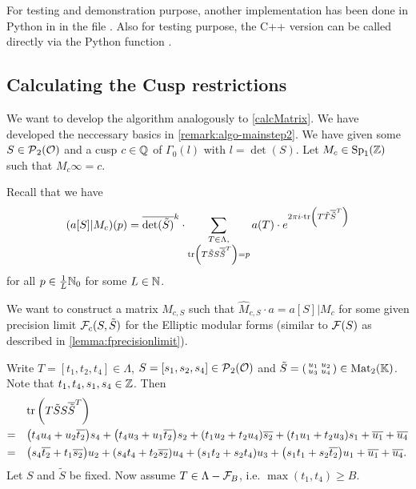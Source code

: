 For testing and demonstration purpose, another implementation has been done in Python in  in the file . Also for testing purpose, the C++ version can be called directly via the Python function .

\subsection{Calculating the Cusp restrictions}
\label{calcMatrixTrans}
We want to develop the algorithm analogously to \cref{calcMatrix}. We have developed the neccessary basics in \cref{remark:algo-mainstep2}. We have given some $S \in \operatorname{\mathcal{P}}_2(\mathcal{O})$ and a cusp $c \in \mathbb{Q}$ of $\Gamma_0(l)$ with $l = \det(S)$. Let $M_c \in \operatorname{Sp}_1(\mathbb{Z})$ such that $M_c \infty = c$.

Recall that we have
\[ (a[S]| M_c) (p) = \overline{\det(\tilde{S})}^k \cdot \sum_{\begin{subarray}{c}
T \in \Lambda,\\
\textup{\textrm{tr}}\left(T \tilde{S} S \overline{\tilde{S}}^T\right) = p
\end{subarray}} a(T) \cdot e^{2 \pi i \cdot \textup{\textrm{tr}}\left(T \tilde{T} \overline{\tilde{S}}^T\right)} \]
for all $p \in \frac{1}{L} \mathbb{N}_0$ for some $L \in \mathbb{N}$.

We want to construct a matrix $\hat{M}_{c,S}$ such that $\hat{M}_{c,S} \cdot a = a[S]|M_c$ for some given precision limit $\mathcal{F}_c(S, \tilde{S})$ for the Elliptic modular forms (similar to $\mathcal{F}(S)$ as described in \cref{lemma:fprecisionlimit}).

Write $T = [t_1,t_2,t_4] \in \Lambda$, $S = [s_1,s_2,s_4] \in \operatorname{\mathcal{P}}_2(\mathcal{O})$ and $\tilde{S} = \left( \begin{smallmatrix} u_1 & u_2 \\ u_3 & u_4 \end{smallmatrix} \right) \in \operatorname{Mat}_2(\mathbb{K})$.  Note that $t_1,t_4,s_1,s_4 \in \mathbb{Z}$. Then
\begin{align*}
& \textup{\textrm{tr}}\left(T \tilde{S} S \overline{\tilde{S}}^T\right) \\
=\quad & {\left(t_{4} u_{4} + u_{2} \overline{t_{2}}\right)} s_{4} + {\left(t_{4} u_{3} + u_{1} \overline{t_{2}}\right)} s_{2} + {\left(t_{1} u_{2} + t_{2} u_{4}\right)} \overline{s_{2}} + {\left(t_{1} u_{1} + t_{2} u_{3}\right)} s_{1} + \overline{u_{1}} + \overline{u_{4}} \\
=\quad & {\left(s_{4} \overline{t_{2}} + t_{1} \overline{s_{2}}\right)} u_{2} + {\left(s_{4} t_{4} + t_{2} \overline{s_{2}}\right)} u_{4} + {\left(s_{1} t_{2} + s_{2} t_{4}\right)} u_{3} + {\left(s_{1} t_{1} + s_{2} \overline{t_{2}}\right)} u_{1} + \overline{u_{1}} + \overline{u_{4}} .
\end{align*}
Let $S$ and $\tilde{S}$ be fixed. Now assume $T \in \Lambda - \mathcal{F}_B$, i.e. $\max(t_1,t_4) \ge B$.

